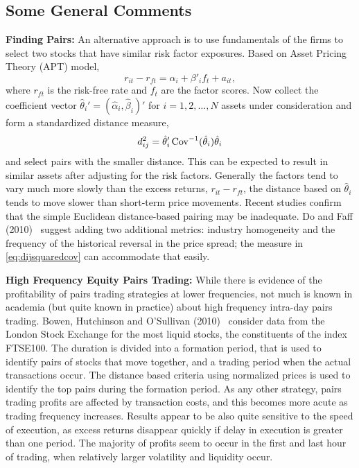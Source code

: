 \subsection{Some General Comments}

\noindent\textbf{Finding Pairs:} An alternative approach is to use fundamentals of the firms to select two stocks that have similar risk factor exposures. Based on Asset Pricing Theory (APT) model,
	\begin{equation}
	r_{it} - r_{ft} = \alpha_i + \beta'_if_t + a_{it},
	\end{equation}
where $r_{ft}$ is the risk-free rate and $f_t$ are the factor scores. Now collect the coefficient vector $\hat{\theta}_i' = (\hat{\alpha}_i, \hat{\beta}_i)'$ for $i = 1, 2, \ldots, N$ assets under consideration and form a standardized distance measure,
	\begin{equation} \label{eq:dijsquaredcov}
	d_{ij}^2 = \hat{\theta}_i' \cov^{-1}(\hat{\theta}_i)\hat{\theta}_i
	\end{equation}
and select pairs with the smaller distance. This can be expected to result in similar assets after adjusting for the risk factors. Generally the factors tend to vary much more slowly than the excess returns, $r_{it} - r_{ft}$, the distance based on $\hat{\theta}_i$ tends to move slower than short-term price movements. Recent studies confirm that the simple Euclidean distance-based pairing may be inadequate. Do and Faff (2010)~\cite{do2010does} suggest adding two additional metrics: industry homogeneity and the frequency of the historical reversal in the price spread; the measure in \eqref{eq:dijsquaredcov} can accommodate that easily. \twomedskip


\noindent\textbf{High Frequency Equity Pairs Trading:} While there is evidence of the profitability of pairs trading strategies at lower frequencies, not much is known in academia (but quite known in practice) about high frequency intra-day pairs trading. Bowen, Hutchinson and O'Sullivan (2010)~\cite{bho} consider data from the London Stock Exchange for the most liquid stocks, the constituents of the index FTSE100. The duration is divided into a formation period, that is used to identify pairs of stocks that move together, and a trading period when the actual transactions occur. The distance based criteria using normalized prices is used to identify the top pairs during the formation period. As any other strategy, pairs trading profits are affected by transaction costs, and this becomes more acute as trading frequency increases. Results appear to be also quite sensitive to the speed of execution, as excess returns disappear quickly if delay in execution is greater than one period. The majority of profits seem to occur in the first and last hour of trading, when relatively larger volatility and liquidity occur.


